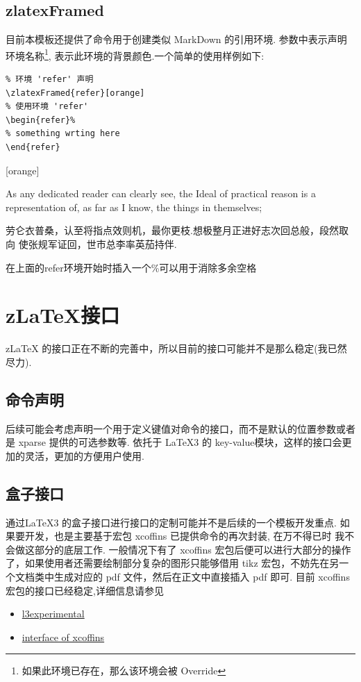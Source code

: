 \subsection{zlatexFramed}
目前本模板还提供了命令\index{\cmd{\zlatexFramed}}用于创建类似 MarkDown
的引用环境. 参数中表示声明环境名称\footnote{如果此环境已存在，那么该环境会被 Override},
 表示此环境的背景颜色.一个简单的使用样例如下:

\begin{verbatim}
% 环境 'refer' 声明
\zlatexFramed{refer}[orange]
% 使用环境 'refer'
\begin{refer}%
% something wrting here
\end{refer}
\end{verbatim}

[orange]
\begin{refer}%
As any dedicated reader can clearly see, the Ideal of practical
reason is a representation of, as far as I know, the things in themselves;

劳仑衣普桑，认至将指点效则机，最你更枝.想极整月正进好志次回总般，段然取向
使张规军证回，世市总李率英茄持伴.
\end{refer}

\begin{remark}
  在上面的refer环境开始时插入一个\%可以用于消除多余空格
\end{remark}

\clearpage
\section{z\LaTeX{}接口}
z\LaTeX{} 的接口正在不断的完善中，所以目前的接口可能并不是那么稳定(我已然尽力). 

\subsection{命令声明}
后续可能会考虑声明一个用于定义键值对命令的接口，而不是默认的位置参数或者是 xparse 提供的可选参数等.
依托于 \LaTeX3 的 {key-value}模块，这样的接口会更加的灵活，更加的方便用户使用.


\subsection{盒子接口}
通过\LaTeX3 的盒子接口进行接口的定制可能并不是后续的一个模板开发重点. 如果要开发，也是主要基于宏包 {xcoffins} 已提供命令的再次封装, 在万不得已时
我不会做这部分的底层工作. 一般情况下有了 {xcoffins} 宏包后便可以进行大部分的操作了，如果使用者还需要绘制部分复杂的图形只能够借用 {tikz}
宏包，不妨先在另一个文档类中生成对应的 pdf 文件，然后在正文中直接插入 pdf 即可. 目前 xcoffins 宏包的接口已经稳定,详细信息请参见
\begin{itemize}
    \item \href{https://ctan.org/pkg/l3experimental}{l3experimental}
    \item \href{https://tex.stackexchange.com/a/397835/294585}{interface of xcoffins}
\end{itemize}

